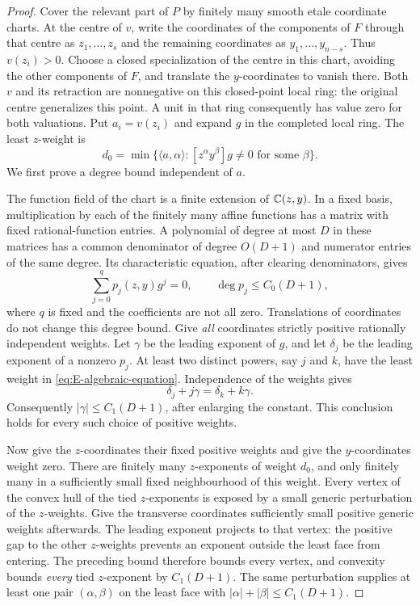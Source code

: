 \begin{proof}
Cover the relevant part of $P$ by finitely many smooth etale coordinate
charts. At the centre of $v$, write the coordinates of the components
of $F$ through that centre as $z_1,\ldots,z_s$ and the remaining
coordinates as $y_1,\ldots,y_{n-s}$. Thus $v(z_i)>0$.
Choose a closed specialization of the centre in this chart, avoiding
the other components of $F$, and translate the $y$-coordinates to
vanish there. Both $v$ and its retraction are nonnegative on this
closed-point local ring: the original centre generalizes this point.
A unit in that ring consequently has value zero for both valuations.
Put $a_i=v(z_i)$ and expand $g$ in the completed local ring.
The least $z$-weight is
\[
 d_0=\min\{\langle a,\alpha\rangle:
               [z^\alpha y^\beta]g\ne0\text{ for some }\beta\}.
\]
We first prove a degree bound independent of $a$.

The function field of the chart is a finite extension of
$\mathbb C(z,y)$. In a fixed basis, multiplication by each of the finitely
many affine functions has a matrix with fixed rational-function
entries. A polynomial of degree at most $D$ in these matrices has a
common denominator of degree $O(D+1)$ and numerator entries of the
same degree. Its characteristic equation, after clearing denominators,
gives
\begin{equation}\label{eq:E-algebraic-equation}
 \sum_{j=0}^{q}p_j(z,y)g^j=0,\qquad
 \deg p_j\le C_0(D+1),
\end{equation}
where $q$ is fixed and the coefficients are not all zero.
Translations of coordinates do not change this degree bound.
Give \emph{all} coordinates strictly positive rationally independent
weights. Let $\gamma$ be the leading exponent of $g$, and let $\delta_j$
be the leading exponent of a nonzero $p_j$. At least two distinct
powers, say $j$ and $k$, have the least weight in
\eqref{eq:E-algebraic-equation}. Independence of the weights gives
\[
 \delta_j+j\gamma=\delta_k+k\gamma.
\]
Consequently $|\gamma|\le C_1(D+1)$, after enlarging the constant.
This conclusion holds for every such choice of positive weights.

Now give the $z$-coordinates their fixed positive weights and give the
$y$-coordinates weight zero. There are finitely many $z$-exponents
of weight $d_0$, and only finitely many in a sufficiently small fixed
neighbourhood of this weight. Every vertex of the convex hull of the
tied $z$-exponents is exposed by a small generic perturbation of the
$z$-weights. Give the transverse coordinates sufficiently small positive
generic weights afterwards. The leading exponent projects to that
vertex: the positive gap to the other $z$-weights prevents an exponent
outside the least face from entering. The preceding bound therefore
bounds every vertex, and convexity bounds \emph{every} tied
$z$-exponent by $C_1(D+1)$. The same perturbation supplies at least one
pair $(\alpha,\beta)$ on the least face with
$|\alpha|+|\beta|\le C_1(D+1)$.


\end{proof}
